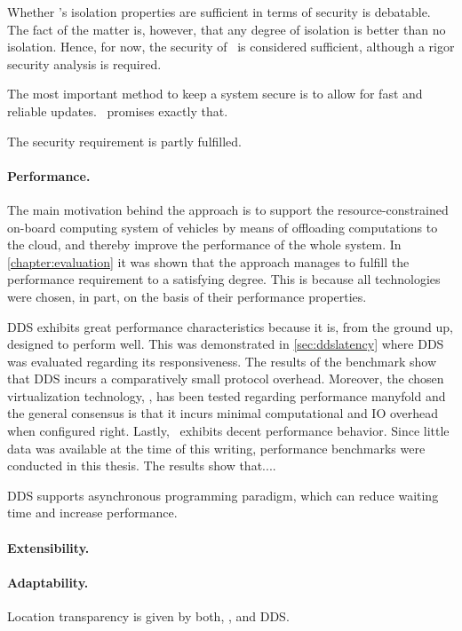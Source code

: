 Whether \docker 's isolation properties are sufficient in terms of security is debatable. The fact of the matter is, however, that any degree of isolation is better than no isolation. Hence, for now, the security of \docker\ is considered sufficient, although a rigor security analysis is required.

The most important method to keep a system secure is to allow for fast and reliable updates. \docker\ promises exactly that.

The security requirement is partly fulfilled.

\paragraph{Performance.}
The main motivation behind the approach is to support the resource-constrained on-board computing system of vehicles by means of offloading computations to the cloud, and thereby improve the performance of the whole system. In \autoref{chapter:evaluation} it was shown that the approach manages to fulfill the performance requirement to a satisfying degree. This is because all technologies were chosen, in part, on the basis of their performance properties.

DDS exhibits great performance characteristics because it is, from the ground up, designed to perform well. This was demonstrated in \autoref{sec:ddslatency} where DDS was evaluated regarding its responsiveness. The results of the benchmark show that DDS incurs a comparatively small protocol overhead. Moreover, the chosen virtualization technology, \docker , has been tested regarding performance manyfold  \cite{felter2015updated,morabito2015hypervisors} and the general consensus is that it incurs minimal computational and IO overhead when configured right. Lastly, \wnet\ exhibits decent performance behavior. Since little data was available at the time of this writing, performance benchmarks were conducted in this thesis. The results show that....

DDS supports asynchronous programming paradigm, which can reduce waiting time and increase performance.

\paragraph{Extensibility.}

\paragraph{Adaptability.}
Location transparency is given by both, \wnet , and DDS.

